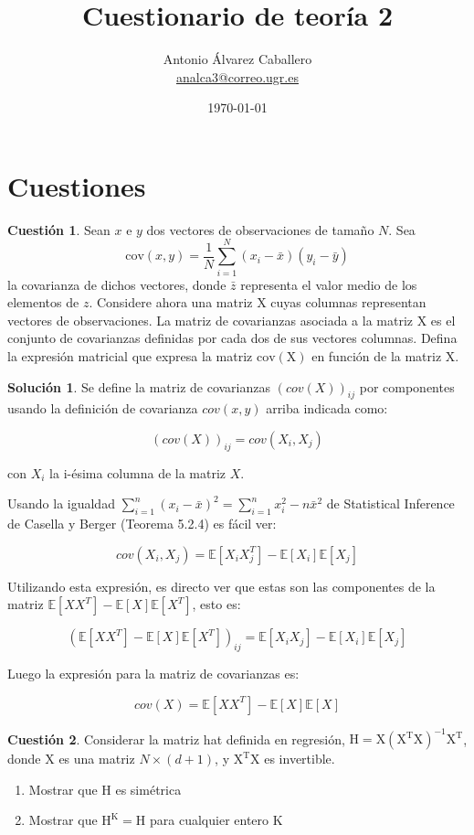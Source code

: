 \documentclass[a4paper, 11pt]{article}
\title{Cuestionario de teoría 2}
\author{Antonio Álvarez Caballero\\
    \href{mailto:analca3@correo.ugr.es}{analca3@correo.ugr.es}}
\date{\today}
\theoremstyle{definition}
\newtheorem{cuestion}{Cuestión}
\newtheorem*{solucion}{Solución}
\begin{document}
  \maketitle

  \section{Cuestiones}

  \begin{cuestion}
    Sean $x$ e $y$ dos vectores de observaciones de tamaño $N$. Sea
    \[
    \mathrm{cov}(x,y)=\frac{1}{N}\sum_{i=1}^N (x_i-\bar{x})(y_i-\bar{y})
    \]
    la covarianza de dichos vectores, donde $\bar{z}$ representa el valor medio de los elementos de $z$. Considere ahora una matriz $\mathrm{X}$ cuyas columnas representan vectores de observaciones. La matriz de covarianzas asociada a la matriz $\mathrm{X}$ es el conjunto de covarianzas definidas por cada dos de sus vectores columnas. Defina la expresión matricial que expresa la matriz $\mathrm{cov}(\mathrm{X})$ en función de la matriz $\mathrm{X}$.
  \end{cuestion}

  \begin{solucion}
    Se define la matriz de covarianzas $(cov(X))_{ij}$ por componentes usando la definición de covarianza $cov(x,y)$ arriba indicada como:

    \[
      (cov(X))_{ij} = cov(X_i, X_j)
    \]

    con $X_i$ la i-ésima columna de la matriz $X$.

    Usando la igualdad $\sum_{i=1}^n(x_i-\bar{x})^2 = \sum_{i=1}^n x_i^2 - n \bar{x}^2$ de Statistical Inference de Casella y Berger (Teorema 5.2.4) es fácil ver:

    $$ cov(X_i, X_j) = \mathbb{E}[X_iX_j^T] - \mathbb{E}[X_i]\mathbb{E}[X_j] $$

    Utilizando esta expresión, es directo ver que estas son las componentes de la matriz $ \mathbb{E}[XX^T] - \mathbb{E}[X]\mathbb{E}[X^T] $, esto es:

    $$ (\mathbb{E}[XX^T] - \mathbb{E}[X]\mathbb{E}[X^T])_{ij} =  \mathbb{E}[X_iX_j] - \mathbb{E}[X_i]\mathbb{E}[X_j] $$

    Luego la expresión para la matriz de covarianzas es:

    $$ cov(X) = \mathbb{E}[XX^T] - \mathbb{E}[X]\mathbb{E}[X] $$
  \end{solucion}

  \begin{cuestion}
    Considerar la matriz hat definida en regresión,  $\mathrm{H}=\mathrm{X(X^TX)^{-1}X^T}$, donde $\mathrm{X}$ es una matriz  $N\times (d+1)$, y $\mathrm{X^TX}$ es invertible.
    \begin{enumerate}
        \item Mostrar que H es simétrica
        \item Mostrar que $\mathrm{H^K=H}$ para cualquier entero K
    \end{enumerate}
  \end{cuestion}
\end{document}
